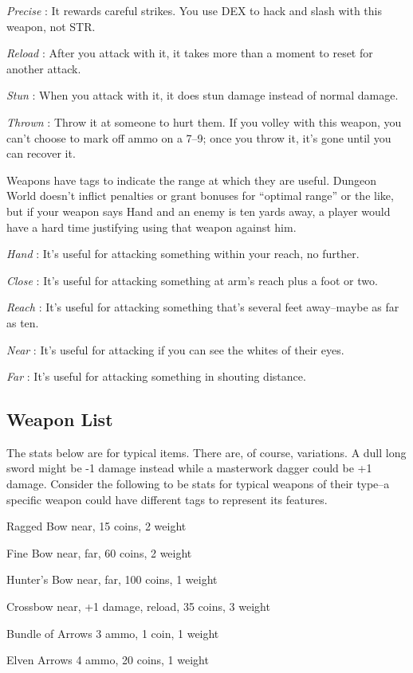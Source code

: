  \emph{Precise}
: It rewards careful strikes. You use DEX to hack and slash with this weapon, not STR.


 \emph{Reload}
: After you attack with it, it takes more than a moment to reset for another attack. 


 \emph{Stun}
: When you attack with it, it does stun damage instead of normal damage. 


 \emph{Thrown}
: Throw it at someone to hurt them. If you volley with this weapon, you can't choose to mark off ammo on a 7--9; once you throw it, it's gone until you can recover it. 


 Weapons have tags to indicate the range at which they are useful. Dungeon World doesn't inflict penalties or grant bonuses for ``optimal range'' or the like, but if your weapon says Hand and an enemy is ten yards away, a player would have a hard time justifying using that weapon against him.


 \emph{Hand}
: It's useful for attacking something within your reach, no further.


 \emph{Close}
: It's useful for attacking something at arm's reach plus a foot or two.


 \emph{Reach}
: It's useful for attacking something that's several feet away--maybe as far as ten. 


 \emph{Near}
: It's useful for attacking if you can see the whites of their eyes. 


 \emph{Far}
: It's useful for attacking something in shouting distance.
\subsection{Weapon List}


 The stats below are for typical items. There are, of course, variations. A dull long sword might be -1 damage instead while a masterwork dagger could be +1 damage. Consider the following to be stats for typical weapons of their type--a specific weapon could have different tags to represent its features.


 Ragged Bow near, 15 coins, 2 weight


 Fine Bow near, far, 60 coins, 2 weight


 Hunter's Bow near, far, 100 coins, 1 weight


 Crossbow near, +1 damage, reload, 35 coins, 3 weight


 Bundle of Arrows 3 ammo, 1 coin, 1 weight


 Elven Arrows 4 ammo, 20 coins, 1 weight


